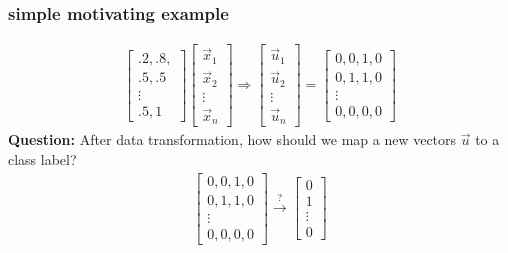 \documentclass[handout,compress]{beamer}
\begin{document}
\begin{frame}
	\frametitle{simple motivating example}
	\begin{align*}
			\begin{bmatrix}
		.2,.8,\\
		 .5,.5\\ 
		\vdots \\
		.5,1
	\end{bmatrix} 
		\begin{bmatrix}
		\vec{x}_1\\
		\vec{x}_2 \\ 
		\vdots \\
		\vec{x}_n
		\end{bmatrix} \Longrightarrow
		\begin{bmatrix}
		\vec{u}_1\\
		\vec{u}_2 \\ 
		\vdots \\
		\vec{u}_n
		\end{bmatrix}
		= 	\begin{bmatrix}
		0,0,1,0\\
		0,1,1,0\\ 
		\vdots \\
		0,0,0,0
		\end{bmatrix}
	\end{align*}
	\textbf{Question:} After data transformation, how should we map a new vectors $\vec{u}$ to a class label?
		\begin{align*}
	\begin{bmatrix}
		0,0,1,0\\
		0,1,1,0\\ 
		\vdots \\
		0,0,0,0
	\end{bmatrix} \xrightarrow{?}
	\begin{bmatrix}
	0\\
	1 \\ 
	\vdots \\
	0
	\end{bmatrix}
	\end{align*}
\end{frame}
\end{document}
